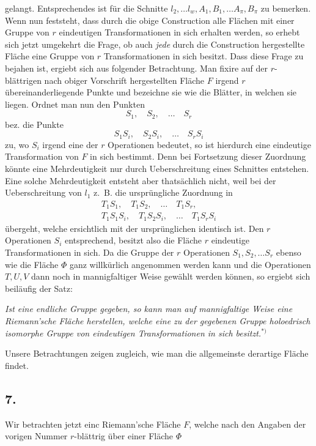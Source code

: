 \documentclass{article}
\begin{document}
gelangt. Entsprechendes ist für die Schnitte $l_2, \dots l_w, A_1, B_1, \dots A_\pi, B_\pi$ zu bemerken. Wenn nun feststeht, dass durch die obige Construction alle Flächen mit einer Gruppe von $r$ eindeutigen Transformationen in sich erhalten werden, so erhebt sich jetzt umgekehrt die Frage, ob auch \emph{jede} durch die Construction hergestellte Fläche eine Gruppe von $r$ Transformationen in sich besitzt. Dass diese Frage zu bejahen ist, ergiebt sich aus folgender Betrachtung. Man fixire auf der $r$-blättrigen nach obiger Vorschrift hergestellten Fläche $F$ irgend $r$ übereinanderliegende Punkte und bezeichne sie wie die Blätter, in welchen sie liegen. Ordnet man nun den Punkten
\[
S_1, \quad S_2, \quad \dots \quad S_r
\]
bez. die Punkte
\[
S_1 S_i, \quad S_2 S_i, \quad \dots \quad S_r S_i
\]
zu, wo $S_i$ irgend eine der $r$ Operationen bedeutet, so ist hierdurch eine eindeutige Transformation von $F$ in sich bestimmt. Denn bei Fortsetzung dieser Zuordnung könnte eine Mehrdeutigkeit nur durch Ueberschreitung eines Schnittes entstehen. Eine solche Mehrdeutigkeit entsteht aber thatsächlich nicht, weil bei der Ueberschreitung von $l_1$ z.~B. die ursprüngliche Zuordnung in
\[
\begin{gathered}
T_1 S_1, \quad T_1 S_2, \quad \dots \quad T_1 S_r, \\
T_1 S_1 S_i, \quad T_1 S_2 S_i, \quad \dots \quad T_1 S_r S_i
\end{gathered}
\]
übergeht, welche ersichtlich mit der ursprünglichen identisch ist. Den $r$ Operationen $S_i$ entsprechend, besitzt also die Fläche $r$ eindeutige Transformationen in sich. Da die Gruppe der $r$ Operationen $S_1, S_2, \dots S_r$ ebenso wie die Fläche $\Phi$ ganz willkürlich angenommen werden kann und die Operationen $T, U, V$ dann noch in mannigfaltiger Weise gewählt werden können, so ergiebt sich beiläufig der Satz:

\emph{Ist eine endliche Gruppe gegeben, so kann man auf mannigfaltige Weise eine Riemann'sche Fläche herstellen, welche eine zu der gegebenen Gruppe holoedrisch isomorphe Gruppe von eindeutigen Transformationen in sich besitzt.}${}^{*)}$

Unsere Betrachtungen zeigen zugleich, wie man die allgemeinste derartige Fläche findet.

\subsection*{7.}

Wir betrachten jetzt einc Riemann'sche Fläche $F$, welche nach den Angaben der vorigen Nummer $r$-blättrig über einer Fläche $\Phi$
\end{document}

